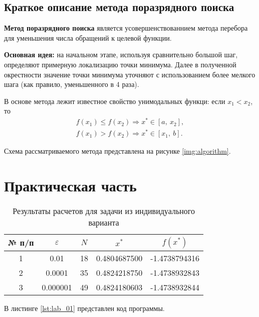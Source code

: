 \documentclass{bmstu}
\begin{document}
\section{Краткое описание метода поразрядного поиска}

\textbf{Метод поразрядного поиска} является усовершенствованнием метода перебора для уменьшения числа обращений к целевой функции.

\textbf{Основная идея:} на начальном этапе, используя сравнительно большой шаг, определяют примерную локализацию точки минимума. Далее в полученной окрестности значение точки минимума уточняют с использованием более мелкого шага (как правило, уменьшенного в 4 раза).

В основе метода лежит известное свойство унимодальных функци: если $x_1 < x_2$, то
\begin{align}
    f(x_1) \leqslant f(x_2) \Rightarrow x^* \in [a, \ x_2], \nonumber \\
    f(x_1) > f(x_2) \Rightarrow x^* \in [x_1, \ b].
\end{align}

Схема рассматриваемого метода представлена на рисунке \ref{img:algorithm}. 



\chapter{Практическая часть}

\begin{table}[H]
    \centering
	\caption{Результаты расчетов для задачи из индивидуального варианта}
    \label{tbl:task}
	\begin{tabular}{|c|c|c|c|c|}
        \hline
        № п/п & $\varepsilon$ & $N$ & $x^*$ & $f(x^*)$ \\ \hline
        1 & 0.01 & 18 & 0.4804687500 & -1.4738794316 \\ \hline
        2 & 0.0001 & 35 & 0.4824218750 & -1.4738932843 \\ \hline
        3 & 0.000001 & 49 & 0.4824180603 & -1.4738932844 \\ \hline
    \end{tabular}
\end{table}

В листинге \ref{lst:lab_01} представлен код программы.

\end{document}
